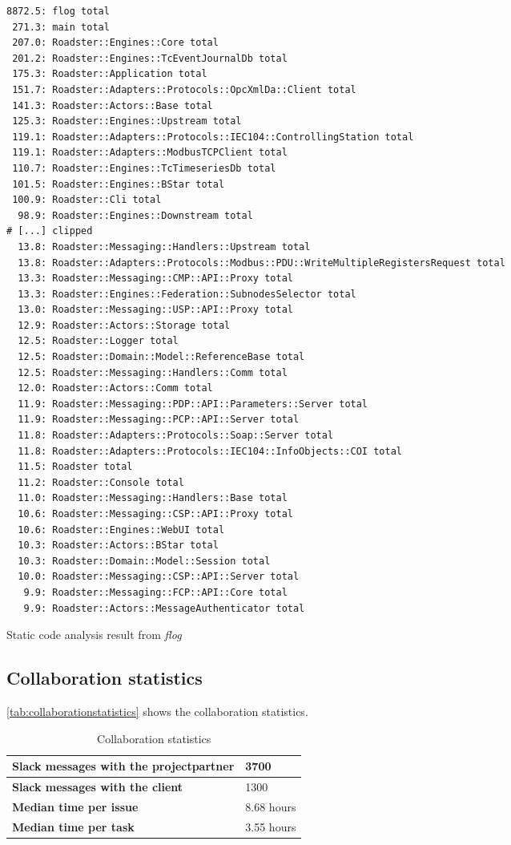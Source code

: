 \begin{listing}[H]
	\begin{verbatim}
8872.5: flog total
 271.3: main total
 207.0: Roadster::Engines::Core total
 201.2: Roadster::Engines::TcEventJournalDb total
 175.3: Roadster::Application total
 151.7: Roadster::Adapters::Protocols::OpcXmlDa::Client total
 141.3: Roadster::Actors::Base total
 125.3: Roadster::Engines::Upstream total
 119.1: Roadster::Adapters::Protocols::IEC104::ControllingStation total
 119.1: Roadster::Adapters::ModbusTCPClient total
 110.7: Roadster::Engines::TcTimeseriesDb total
 101.5: Roadster::Engines::BStar total
 100.9: Roadster::Cli total
  98.9: Roadster::Engines::Downstream total
# [...] clipped
  13.8: Roadster::Messaging::Handlers::Upstream total
  13.8: Roadster::Adapters::Protocols::Modbus::PDU::WriteMultipleRegistersRequest total
  13.3: Roadster::Messaging::CMP::API::Proxy total
  13.3: Roadster::Engines::Federation::SubnodesSelector total
  13.0: Roadster::Messaging::USP::API::Proxy total
  12.9: Roadster::Actors::Storage total
  12.5: Roadster::Logger total
  12.5: Roadster::Domain::Model::ReferenceBase total
  12.5: Roadster::Messaging::Handlers::Comm total
  12.0: Roadster::Actors::Comm total
  11.9: Roadster::Messaging::PDP::API::Parameters::Server total
  11.9: Roadster::Messaging::PCP::API::Server total
  11.8: Roadster::Adapters::Protocols::Soap::Server total
  11.8: Roadster::Adapters::Protocols::IEC104::InfoObjects::COI total
  11.5: Roadster total
  11.2: Roadster::Console total
  11.0: Roadster::Messaging::Handlers::Base total
  10.6: Roadster::Messaging::CSP::API::Proxy total
  10.6: Roadster::Engines::WebUI total
  10.3: Roadster::Actors::BStar total
  10.3: Roadster::Domain::Model::Session total
  10.0: Roadster::Messaging::CSP::API::Server total
   9.9: Roadster::Messaging::FCP::API::Core total
   9.9: Roadster::Actors::MessageAuthenticator total
	\end{verbatim}
	\caption{Static code analysis result from \emph{flog}}
	\label{lst:metrics:flay}
\end{listing}

\subsection{Collaboration statistics}
\autoref{tab:collaborationstatistics} shows the collaboration statistics.
\begin{table}[H]
  \centering
  \begin{tabular}{|m{60mm}|m{20mm}|}
	\hline
	\bf Slack messages with the projectpartner & 3700 \\
	\hline
	\bf Slack messages with the client & 1300 \\
	\hline
	\bf Median time per issue  & 8.68 hours \\
	\hline
	\bf Median time per task & 3.55 hours \\
    \hline
  \end{tabular} \\
  \caption{Collaboration statistics}
  \label{tab:collaborationstatistics}
\end{table}

